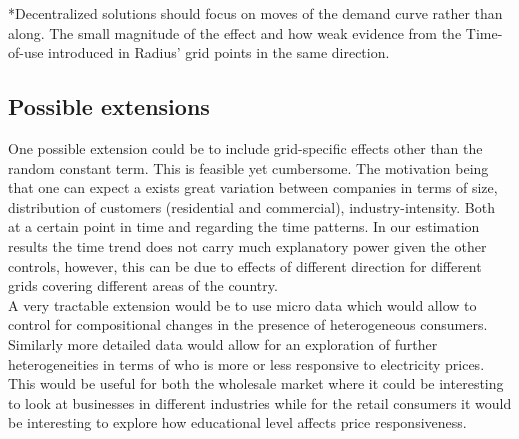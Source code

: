 *Decentralized solutions should focus on moves of the demand curve rather than along. %
The small magnitude of the effect and how weak evidence from the Time-of-use introduced in Radius' grid points in the same direction.
\smallskip \\ 

\subsection{Possible extensions}
\label{subsec:r_extensions}
One possible extension could be to include grid-specific effects other than the random constant term. This is feasible yet cumbersome. The motivation being that one can expect a exists great variation between companies in terms of size, distribution of customers (residential and commercial), industry-intensity. Both at a certain point in time and regarding the time patterns. In our estimation results the time trend does not carry much explanatory power given the other controls, however, this can be due to effects of different direction for different grids covering different areas of the country.
\medskip\\
A very tractable extension would be to use micro data which would allow to control for compositional changes in the presence of heterogeneous consumers. Similarly more detailed data would allow for an exploration of further heterogeneities in terms of who is more or less responsive to electricity prices. This would be useful for both the wholesale market where it could be interesting to look at businesses in different industries while for the retail consumers it would be interesting to explore how educational level affects price responsiveness.
